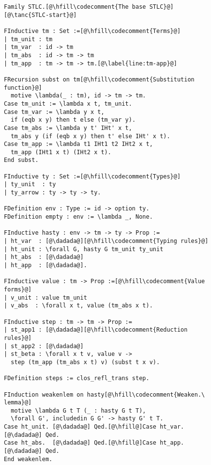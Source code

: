 \begin{figure}
\begin{minipage}{\textwidth}
\begin{multicols}{2}



\begin{lstlisting}
Family STLC.[@\hfill\codecomment{The base STLC}@][@\tanc{STLC-start}@]

FInductive tm : Set :=[@\hfill\codecomment{Terms}@]
| tm_unit : tm
| tm_var  : id -> tm
| tm_abs  : id -> tm -> tm
| tm_app  : tm -> tm -> tm.[@\label{line:tm-app}@]

FRecursion subst on tm[@\hfill\codecomment{Substitution function}@] 
  motive \lambda(_ : tm), id -> tm -> tm.
Case tm_unit := \lambda x t, tm_unit.
Case tm_var := \lambda y x t,
  if (eqb x y) then t else (tm_var y).
Case tm_abs := \lambda y t' IHt' x t,
  tm_abs y (if (eqb x y) then t' else IHt' x t).
Case tm_app := \lambda t1 IHt1 t2 IHt2 x t,
  tm_app (IHt1 x t) (IHt2 x t).
End subst.

FInductive ty : Set :=[@\hfill\codecomment{Types}@]
| ty_unit  : ty
| ty_arrow : ty -> ty -> ty.

FDefinition env : Type := id -> option ty.
FDefinition empty : env := \lambda _, None.

FInductive hasty : env -> tm -> ty -> Prop :=
| ht_var  : [@\dadada@][@\hfill\codecomment{Typing rules}@]
| ht_unit : \forall G, hasty G tm_unit ty_unit
| ht_abs  : [@\dadada@]
| ht_app  : [@\dadada@].

FInductive value : tm -> Prop :=[@\hfill\codecomment{Value forms}@]
| v_unit : value tm_unit
| v_abs  : \forall x t, value (tm_abs x t).

FInductive step : tm -> tm -> Prop :=
| st_app1 : [@\dadada@][@\hfill\codecomment{Reduction rules}@]
| st_app2 : [@\dadada@]
| st_beta : \forall x t v, value v ->
  step (tm_app (tm_abs x t) v) (subst t x v).

FDefinition steps := clos_refl_trans step.

FInduction weakenlem on hasty[@\hfill\codecomment{Weaken.\ lemma}@]
  motive \lambda G t T (_ : hasty G t T),
  \forall G', includedin G G' -> hasty G' t T.
Case ht_unit. [@\dadada@] Qed.[@\hfill@]Case ht_var. [@\dadada@] Qed.
Case ht_abs.  [@\dadada@] Qed.[@\hfill@]Case ht_app. [@\dadada@] Qed.
End weakenlem.


\end{lstlisting}
\end{multicols}
\end{minipage}
\end{figure}
